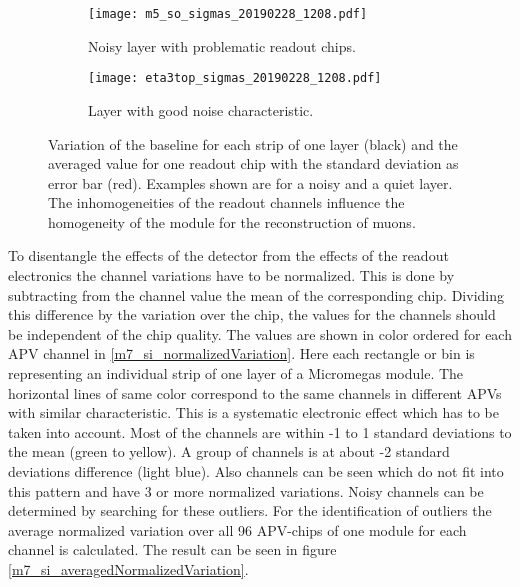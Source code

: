 \documentclass[
twoside,            %
BCOR1.4cm,          %
10pt,               %
headings=normal,    %
headsepline,        %
clearplainpage,		%
final,              %
div=14,
open=right,
bibliography=toc
]{scrreprt}
\begin{document}
\begin{figure}[!h]
	\begin{subfigure}[b]{0.48\textwidth}
		\centering
		\texttt{[image: m5\_so\_sigmas\_20190228\_1208.pdf]}
		\caption{
			Noisy layer with problematic readout chips.
		}
		\label{eta3top_sigmas_20190228_1208} 
	\end{subfigure}
	\hfill
	\begin{subfigure}[b]{0.48\textwidth}
		\centering
		\texttt{[image: eta3top\_sigmas\_20190228\_1208.pdf]}
		\caption{
			Layer with good noise characteristic.
		}
		\label{m5_so_sigmas_20190228_1208} 
	\end{subfigure}
	\vspace{-2mm}
	\caption{
		Variation of the baseline for each strip of one layer (black) and the averaged value for one readout chip with the standard deviation as error bar (red).
		Examples shown are for a noisy and a quiet layer.
		The inhomogeneities of the readout channels influence the homogeneity of the module for the reconstruction of muons.
	}
	\label{sigmas_perAPV}
\end{figure}

To disentangle the effects of the detector from the effects of the readout electronics the channel variations have to be normalized.
This is done by subtracting from the channel value the mean of the corresponding chip. 
Dividing this difference by the variation over the chip, the values for the channels should be independent of the chip quality.
The values are shown in color ordered for each APV channel in \ref{m7_si_normalizedVariation}.
Here each rectangle or bin is representing an individual strip of one layer of a Micromegas module.
The horizontal lines of same color correspond to the same channels in different APVs with similar characteristic.
This is a systematic electronic effect which has to be taken into account.
Most of the channels are within -1 to 1 standard deviations to the mean (green to yellow).
A group of channels is at about -2 standard deviations difference (light blue). 
Also channels can be seen which do not fit into this pattern and have 3 or more normalized variations.
Noisy channels can be determined by searching for these outliers.
For the identification of outliers the average normalized variation over all 96 APV-chips of one module for each channel is calculated.
The result can be seen in figure \ref{m7_si_averagedNormalizedVariation}.
\end{document}
